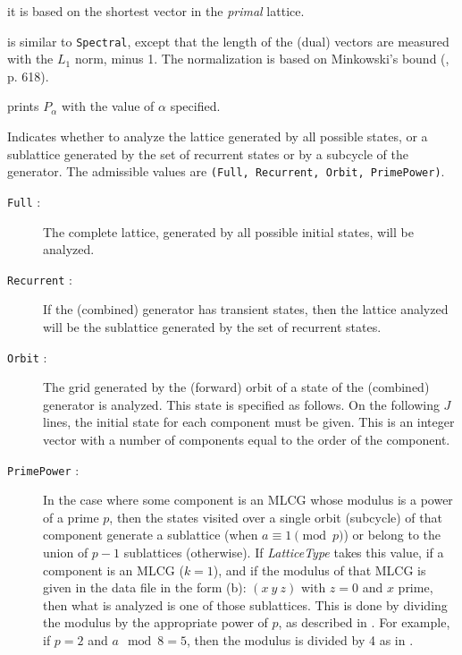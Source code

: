 \begin {description}
\begin {description}
    it is based on the shortest vector in the {\em primal\/} lattice.
  \item [{\tt SpectralL1}] is similar to {\tt Spectral}, except that
    the length of the (dual) vectors are measured with the $L_1$ norm,
    minus 1.  The normalization is based on Minkowski's bound
    (\cite{sFIS96a}, p. 618).
  \item [{\tt Palpha} {\em Alpha} :] prints $P_\alpha$
    with the value of $\alpha$ specified.
  \end {description}
%
\item [{\em LatticeType} :]
  Indicates whether to analyze the lattice generated by all possible states,
  or a sublattice generated by the set of recurrent states or by a
  subcycle of the generator.
  The admissible values are {\tt (Full, Recurrent, Orbit, PrimePower)}.
  \begin {description}
  \item [{\tt Full} :] The complete lattice, generated by all possible
     initial states, will be analyzed.
  \item [{\tt Recurrent} :] If the (combined) generator has transient
     states, then the lattice analyzed will be the sublattice generated by
     the set of recurrent states.
  \item[{\tt Orbit} :] The grid generated by the (forward) orbit of 
     a state of the (combined) generator is analyzed. This state
     is specified as follows. 
     On the following $J$ lines, the initial state for each
     component must be given. This is an integer vector with a number 
     of components equal to the order of the component.
  \item [{\tt PrimePower} :] In the case where some component is an MLCG
     whose modulus is a power of a prime $p$, then the states visited over
     a single orbit (subcycle) of that component generate a sublattice
     (when $a \equiv 1 \pmod{p}$) or belong to the union of
     $p-1$ sublattices (otherwise).  If {\em LatticeType\/} takes this value,
     if a component is an MLCG ($k=1$), 
     and if the modulus of that MLCG is given
     in the data file in the form (b): $(x\ y\ z)$ with $z=0$ and $x$ prime, 
     then what is analyzed
     is one of those sublattices.  This is done by dividing the modulus
     by the appropriate power of $p$, as described in \cite{rLEC97c}.
     For example, if $p=2$ and $a \mod 8 = 5$, then the modulus is divided
     by 4 as in \cite{rFIS90a,rKNU81a}.
  \end {description}
%
\item [{\em LaGroupSizes, ~Spacing\/} :]

\end{description}
